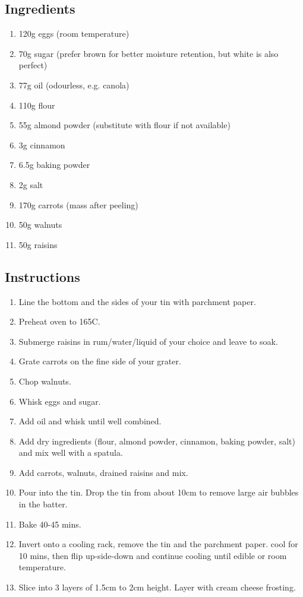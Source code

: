 \documentclass[11pt]{report}
\begin{document}
\subsection*{Ingredients}
\begin{enumerate}
  \item 120g eggs (room temperature)
  \item 70g sugar (prefer brown for better moisture retention, but white is also
  perfect)
  \item 77g oil (odourless, e.g. canola)
  \item 110g flour
  \item 55g almond powder (substitute with flour if not available)
  \item 3g cinnamon
  \item 6.5g baking powder
  \item 2g salt
  \item 170g carrots (mass after peeling)
  \item 50g walnuts
  \item 50g raisins
\end{enumerate}

\subsection*{Instructions}
\begin{enumerate}
  \item Line the bottom and the sides of your tin with parchment paper.
  \item Preheat oven to 165C.
  \item Submerge raisins in rum/water/liquid of your choice and leave to soak.
  \item Grate carrots on the fine side of your grater.
  \item Chop walnuts.
  \item Whisk eggs and sugar.
  \item Add oil and whisk until well combined.
  \item Add dry ingredients (flour, almond powder, cinnamon, baking powder,
  salt) and mix well with a spatula.
  \item Add carrots, walnuts, drained raisins and mix.
  \item Pour into the tin. Drop the tin from about 10cm to remove large air
  bubbles in the batter.
  \item Bake 40-45 mins.
  \item Invert onto a cooling rack, remove the tin and the parchment paper.
  cool for 10 mins, then flip up-side-down and continue cooling until edible or
  room temperature.
  \item Slice into 3 layers of 1.5cm to 2cm height. Layer with cream cheese
  frosting.
\end{enumerate}
\end{document}
